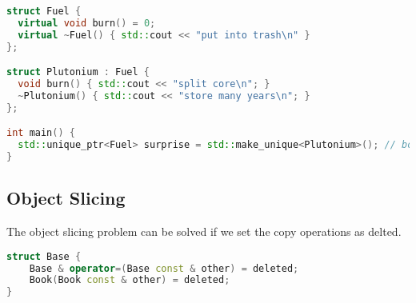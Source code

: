 \begin{lstlisting}[language=C++]
struct Fuel {
  virtual void burn() = 0;
  virtual ~Fuel() { std::cout << "put into trash\n" }
};

struct Plutonium : Fuel {
  void burn() { std::cout << "split core\n"; }
  ~Plutonium() { std::cout << "store many years\n"; }
};

int main() {
  std::unique_ptr<Fuel> surprise = std::make_unique<Plutonium>(); // both called
}
\end{lstlisting}

\subsection{Object Slicing}
The object slicing problem can be solved if we set the copy operations as delted.
\begin{lstlisting}[language=C++]
struct Base {
	Base & operator=(Base const & other) = deleted;
	Book(Book const & other) = deleted;
}
\end{lstlisting}



